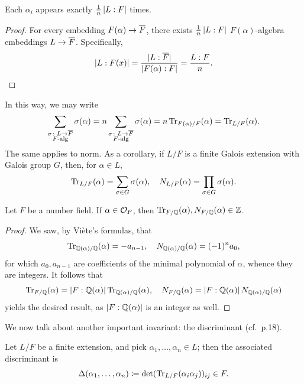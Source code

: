 \begin{claim} \label{clm:number_of_ways_to_extend}
    Each $\alpha_i$ appears exactly $\frac{1}{n} \left\lvert L : F \right\rvert$ times.
\end{claim}
\begin{proof}
    For every embedding $F(\alpha)\to \overline F$, there exists $\frac{1}{n} \left\lvert L:F \right\rvert$ $F(\alpha)$-algebra embeddings $L \to \overline F$. Specifically,
    \[ \left\lvert L : F(x) \right\rvert = \frac{\lvert{L : \overline F}\rvert}{\left\lvert F(\alpha) : F \right\rvert} = \frac{L : F}{n}. \qedhere \]
\end{proof}

In this way, we may write
\[ \sum_{\substack{\sigma \colon L \to \overline F \\ \text{$F$-alg}}} \sigma(\alpha) = n \sum_{\substack{\sigma \colon L \to \overline F \\ \text{$F$-alg}}} \sigma(\alpha) = n \operatorname{Tr}_{F(\alpha)/F}(\alpha) = \operatorname{Tr}_{L/F}(\alpha). \]
The same applies to norm. As a corollary, if $L/F$ is a finite Galois extension with Galois group $G$, then, for $\alpha \in L$,
\[ \operatorname{Tr}_{L/F}(\alpha) = \sum_{\sigma \in G} \sigma(\alpha), \quad N_{L/F}(\alpha) = \prod_{\sigma \in G} \sigma(\alpha). \]

\newpage
\begin{proposition} \label{prop:norm_trace_integer}
    Let $F$ be a number field. If $\alpha \in \mathcal O_F$, then $\operatorname{Tr}_{F/\mathbb Q}(\alpha), N_{F/\mathbb Q}(\alpha) \in \mathbb Z$.
\end{proposition}
\begin{proof}
    We saw, by Vi\`ete's formulas, that
    \[ \operatorname{Tr}_{\mathbb Q(\alpha)/\mathbb Q}(\alpha) = -a_{n-1}, \quad N_{\mathbb Q(\alpha)/\mathbb Q}(\alpha) = (-1)^n a_0, \]
    for which $a_0, a_{n-1}$ are coefficients of the minimal polynomial of $\alpha$, whence they are integers. It follows that
    \[ \operatorname{Tr}_{F/\mathbb Q}(\alpha) = \left\lvert F : \mathbb Q(\alpha) \right\rvert \operatorname{Tr}_{\mathbb Q(\alpha)/\mathbb Q}(\alpha), \quad N_{F/\mathbb Q}(\alpha) = \left\lvert F : \mathbb Q(\alpha) \right\rvert N_{\mathbb Q(\alpha)/\mathbb Q}(\alpha) \]
    yields the desired result, as $\left\lvert F : \mathbb Q(\alpha) \right\rvert$ is an integer as well.
\end{proof}

We now talk about another important invariant: the discriminant (cf.\ p.18).
\begin{definition} \label{defn:discriminant}
    Let $L/F$ be a finite extension, and pick $\alpha_1, \dots, \alpha_n \in L$; then the associated discriminant is
    \[ \Delta(\alpha_1, \dots, \alpha_n) \coloneq \det(\operatorname{Tr}_{L/F}(\alpha_i\alpha_j))_{ij} \in F. \]
\end{definition}

